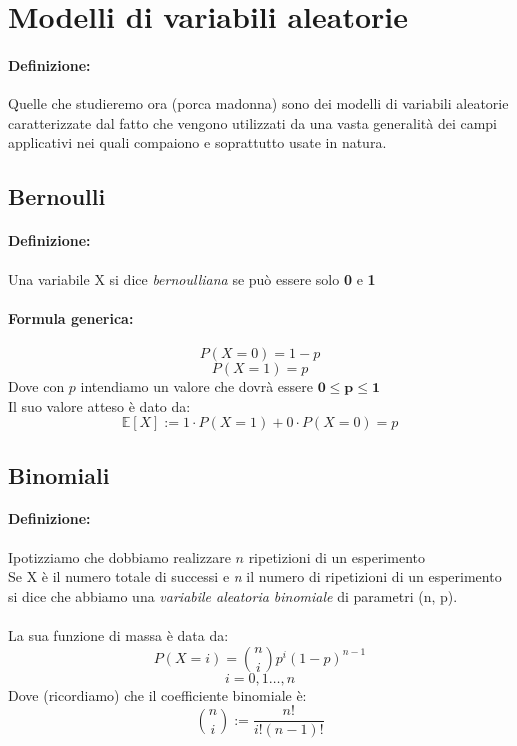 \documentclass[]{article}
\newcommand{\ev}{\mathbb{E}[X]}
\renewcommand{\ev}[1]{\mathbb{E}[#1]}
\newcommand{\definizione}{\paragraph{Definizione:}}
\newcommand{\formula}{\paragraph{Formula generica:}}
\begin{document}
    \newpage
    \section{Modelli di variabili aleatorie}
    \definizione Quelle che studieremo ora (porca madonna) sono dei modelli di variabili aleatorie caratterizzate 
    dal fatto che vengono utilizzati da una vasta generalità dei campi applicativi nei quali compaiono e soprattutto usate in natura.
    \subsection{Bernoulli}
    \definizione Una variabile X si dice \textit{bernoulliana} se può essere solo \textbf{0} e \textbf{1}
    \formula 
    \[ P(X = 0) = 1 - p \]
    \[ P(X = 1) = p \]
    Dove con $p$ intendiamo un valore che dovrà essere $\boldsymbol{0 \leq p \leq 1}$ \\
    Il suo valore atteso è dato da:
    \[ \ev{X} := 1 \cdot P(X = 1) + 0 \cdot P(X = 0) = p \]


    \subsection{Binomiali}
    \definizione Ipotizziamo che dobbiamo realizzare $n$ ripetizioni di un esperimento \\
    Se X è il numero totale di successi e \textit{n} il numero di ripetizioni di un esperimento \\
    si dice che abbiamo una
    \textit{variabile aleatoria binomiale} di parametri (n, p). \\ \\
    La sua funzione di massa è data da:
    \[ P(X = i) = \binom{n}{i}p^i (1-p)^{n-1}  \]
    \[ i = 0,1 \ldots, n \]
    Dove (ricordiamo) che il coefficiente binomiale è:
    \[ \binom{n}{i} := \frac{n!}{i!(n-1)!} \] 
\end{document}
